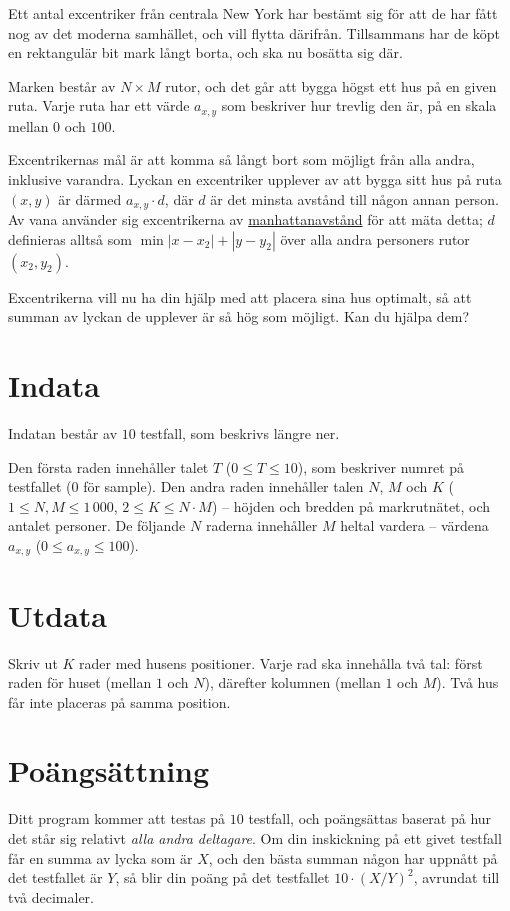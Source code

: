 Ett antal excentriker från centrala New York har bestämt sig för att de har fått nog av det moderna samhället, och vill flytta därifrån.
Tillsammans har de köpt en rektangulär bit mark långt borta, och ska nu bosätta sig där.

Marken består av $N \times M$ rutor, och det går att bygga högst ett hus på en given ruta.
Varje ruta har ett värde $a_{x,y}$ som beskriver hur trevlig den är, på en skala mellan $0$ och $100$. %

Excentrikernas mål är att komma så långt bort som möjligt från alla andra, inklusive varandra.
Lyckan en excentriker upplever av att bygga sitt hus på ruta $(x,y)$ är därmed $a_{x,y} \cdot d$,
där $d$ är det minsta avstånd till någon annan person.
Av vana använder sig excentrikerna av
\href{https://sv.wikipedia.org/wiki/Manhattangeometri}{manhattanavstånd}
för att mäta detta;
$d$ definieras alltså som $\min |x - x_2| + |y - y_2|$ över alla andra personers rutor $(x_2, y_2)$.

Excentrikerna vill nu ha din hjälp med att placera sina hus optimalt, så att summan av
lyckan de upplever är så hög som möjligt. Kan du hjälpa dem?

\section*{Indata}
Indatan består av $10$ testfall, som beskrivs längre ner.

Den första raden innehåller talet $T$ ($0 \le T \le 10$), som beskriver numret på testfallet ($0$ för sample).
Den andra raden innehåller talen $N$, $M$ och $K$ ($1 \le N, M \le 1\,000$, $2 \le K \le N \cdot M$) -- höjden och bredden på markrutnätet, och antalet personer.
De följande $N$ raderna innehåller $M$ heltal vardera -- värdena $a_{x,y}$ ($0 \le a_{x,y} \le 100$).

\section*{Utdata}
Skriv ut $K$ rader med husens positioner.
Varje rad ska innehålla två tal: först raden för huset (mellan $1$ och $N$), därefter kolumnen (mellan $1$ och $M$).
Två hus får inte placeras på samma position.

\section*{Poängsättning}
Ditt program kommer att testas på $10$ testfall, och poängsättas baserat på hur det står sig relativt \emph{alla andra deltagare}.
Om din inskickning på ett givet testfall får en summa av lycka som är $X$, och den bästa summan någon har uppnått på det testfallet är $Y$,
så blir din poäng på det testfallet $10 \cdot (X / Y)^2$, avrundat till två decimaler.

